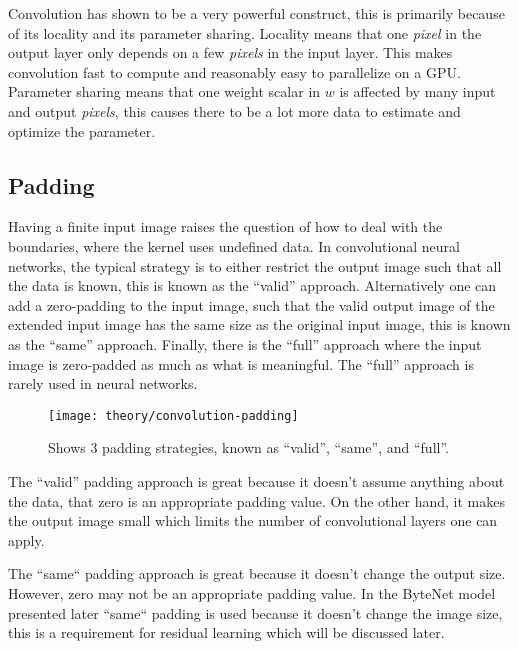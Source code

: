 Convolution has shown to be a very powerful construct, this is primarily because of its locality and its parameter sharing. Locality means that one \textit{pixel} in the output layer only depends on a few \textit{pixels} in the input layer. This makes convolution fast to compute and reasonably easy to parallelize on a GPU. Parameter sharing means that one weight scalar in $w$ is affected by many input and output \textit{pixels}, this causes there to be a lot more data to estimate and optimize the parameter.

\subsection{Padding}
Having a finite input image raises the question of how to deal with the boundaries, where the kernel uses undefined data. In convolutional neural networks, the typical strategy is to either restrict the output image such that all the data is known, this is known as the ``valid'' approach. Alternatively one can add a zero-padding to the input image, such that the valid output image of the extended input image has the same size as the original input image, this is known as the ``same'' approach. Finally, there is the ``full'' approach where the input image is zero-padded as much as what is meaningful. The ``full'' approach is rarely used in neural networks.

\begin{figure}[h]
	\centering
	\texttt{[image: theory/convolution-padding]}
	\caption{Shows 3 padding strategies, known as ``valid'', ``same'', and ``full''.}
	\label{fig:convolution:padding}
\end{figure}

The ``valid'' padding approach is great because it doesn't assume anything about the data, that zero is an appropriate padding value. On the other hand, it makes the output image small which limits the number of convolutional layers one can apply.

The ``same`` padding approach is great because it doesn't change the output size. However, zero may not be an appropriate padding value. In the ByteNet model presented later ``same`` padding is used because it doesn't change the image size, this is a requirement for residual learning which will be discussed later.

